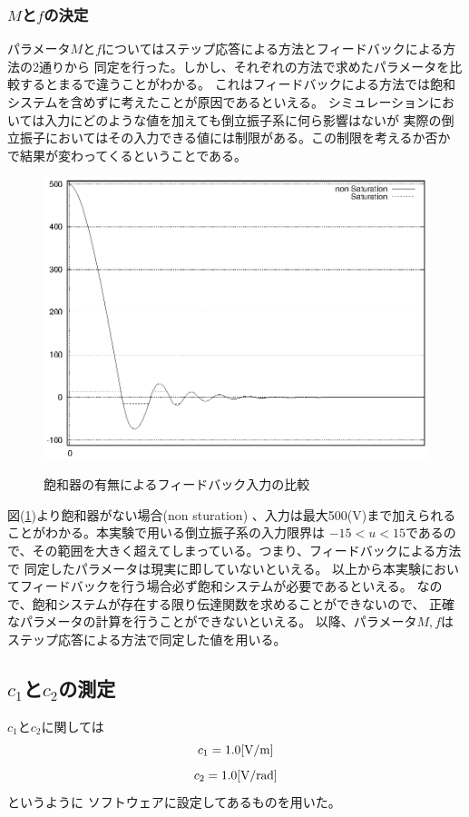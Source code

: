 	\subsubsection{$M$と$f$の決定}
	パラメータ$M$と$f$についてはステップ応答による方法とフィードバックによる方法の2通りから
	同定を行った。しかし、それぞれの方法で求めたパラメータを比較するとまるで違うことがわかる。
	これはフィードバックによる方法では飽和システムを含めずに考えたことが原因であるといえる。
	シミュレーションにおいては入力にどのような値を加えても倒立振子系に何ら影響はないが
	実際の倒立振子においてはその入力できる値には制限がある。この制限を考えるか否か
	で結果が変わってくるということである。
	\begin{figure}[H]
		\centering
		\includegraphics[width=0.5\linewidth]{gazo/feedback_input.eps}\\
		\caption{飽和器の有無によるフィードバック入力の比較}
		\label{image:feedback_saturation}
	\end{figure}
	図(\ref{image:feedback_saturation})より飽和器がない場合(non sturation)
	、入力は最大500(V)まで加えられることがわかる。本実験で用いる倒立振子系の入力限界は
	$-15<u<15$であるので、その範囲を大きく超えてしまっている。つまり、フィードバックによる方法で
	同定したパラメータは現実に即していないといえる。
	以上から本実験においてフィードバックを行う場合必ず飽和システムが必要であるといえる。
	なので、飽和システムが存在する限り伝達関数を求めることができないので、
	正確なパラメータの計算を行うことができないといえる。
	以降、パラメータ$M,f$はステップ応答による方法で同定した値を用いる。
	
\subsection{$c_1$と$c_2$の測定}
	$c_1$と$c_2$に関しては
	\[
		c_1 = 1.0 [\rm{V/m}]
	\]
	\[
		c_2 = 1.0[\rm{V/rad}]
	\]
	というように
	ソフトウェアに設定してあるものを用いた。
